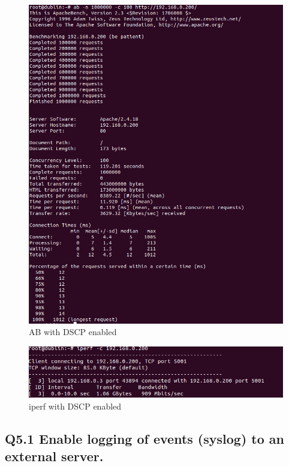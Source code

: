 \documentclass{article}
\begin{document}
\begin{figure}[H]
\centering
\includegraphics[width=15cm]{figures/q4-3-ab-dscp.png}
\caption{AB with DSCP enabled}
\centering
\label{fig:ab_dscp}
\end{figure}


\begin{figure}[H]
\centering
\includegraphics[width=15cm]{figures/q4-3-iperf-dscp.png}
\caption{iperf with DSCP enabled}
\centering
\label{fig:iperf_dscp}
\end{figure}








\subsection{Q5.1 Enable logging of events (syslog) to an external server.}
\end{document}
